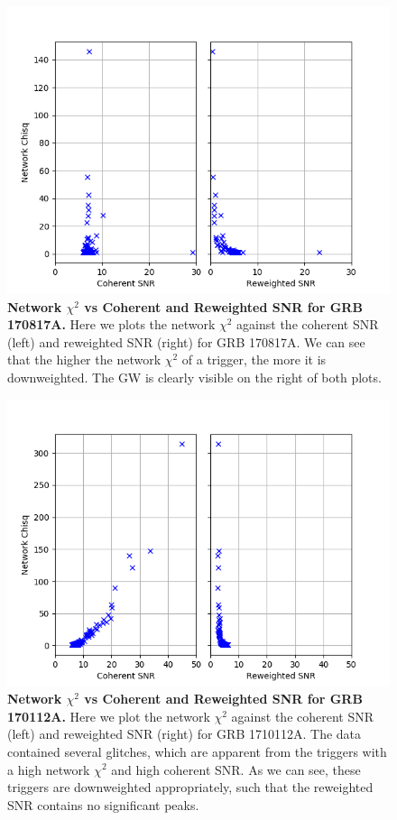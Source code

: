 \documentclass[11pt]{cuthesis}
\begin{document}
\begin{figure} %
\begin{center}
\includegraphics[width=0.8\linewidth]{network_snrs_vs_chisqN_170817.png}
\end{center}
\caption{\textbf{Network $\chi^2$ vs Coherent and Reweighted SNR for GRB 170817A.} Here we plots the network $\chi^2$ against the coherent SNR (left) and reweighted SNR (right) for GRB 170817A. We can see that the higher the network $\chi^2$ of a trigger, the more it is downweighted. The GW is clearly visible on the right of both plots. } 
\label{fig:snrs vs chisq 170817}
\end{figure}

\begin{figure} %
\begin{center}
\includegraphics[width=0.8\linewidth]{network_snrs_vs_chisqN_GRB170112A.png}
\end{center}
\caption{\textbf{Network $\chi^2$ vs Coherent and Reweighted SNR for GRB 170112A.} Here we plot the network $\chi^2$ against the coherent SNR (left) and reweighted SNR (right) for GRB 1710112A. The data contained several glitches, which are apparent from the triggers with a high network $\chi^2$ and high coherent SNR. As we can see, these triggers are downweighted appropriately, such that the reweighted SNR contains no significant peaks.  } 
\label{fig:snrs vs chisq GRB170112A}
\end{figure}
\end{document}
